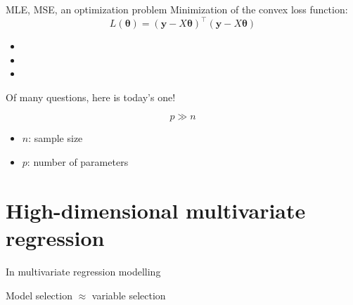 \documentclass[
  ignorenonframetext,
  aspectratio=169]{beamer}
\begin{document}
\begin{frame}{MLE, MSE, an optimization problem}
\protect\hypertarget{mle-mse-an-optimization-problem}{}
Minimization of the convex loss function: \[
L(\boldsymbol{\theta}) = (\mathbf{y} - X\boldsymbol{\theta})^{\top}(\mathbf{y} - X\boldsymbol{\theta})
\]


\vfill

\begin{itemize}
\item
\item
\item
\end{itemize}
\end{frame}

\begin{frame}{Of many questions, here is today's one!}
\protect\hypertarget{of-many-questions-here-is-todays-one}{}
\Huge

\[p \gg n\]

\vfill

\normalsize

\begin{itemize}
\item
  \(n\): sample size
\item
  \(p\): number of parameters
\end{itemize}
\end{frame}

\hypertarget{high-dimensional-multivariate-regression}{%
\section{High-dimensional multivariate
regression}\label{high-dimensional-multivariate-regression}}

\begin{frame}{In multivariate regression modelling}
\protect\hypertarget{in-multivariate-regression-modelling}{}
\Large

Model selection \(\approx\) variable selection
\end{frame}
\end{document}
